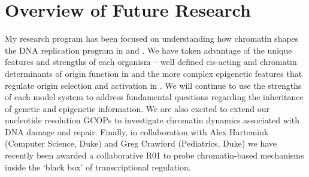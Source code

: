 \section{Overview of Future Research}
My research program has been focused on understanding how chromatin shapes the DNA replication program in \scer and \dros. We have taken advantage of the unique features and strengths of each organism -- well defined cis-acting and chromatin determinants of origin function in \scer and the more complex epigenetic features that regulate origin selection and activation in \dros.  
We will continue to use the strengths of each model system to address fundamental questions regarding the inheritance of genetic and epigenetic information. We are also excited to extend our nucleotide resolution GCOPs to investigate chromatin dynamics associated with DNA damage and repair. Finally, in collaboration with Alex Hartemink (Computer Science, Duke) and Greg Crawford (Pediatrics, Duke) we have recently been awarded a collaborative R01 to probe chromatin-based mechanisms inside the `black box' of transcriptional regulation. 


